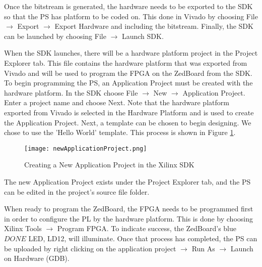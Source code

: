 Once the bitstream is generated, the hardware needs to be exported to the SDK so that the PS has platform to be coded on. This done in Vivado by choosing File $\rightarrow$ Export $\rightarrow$ Export Hardware and including the bitstream. Finally, the SDK can be launched by choosing File $\rightarrow$ Launch SDK.
\par
When the SDK launches, there will be a hardware platform project in the Project Explorer tab. This file contains the hardware platform that was exported from Vivado and will be used to program the FPGA on the ZedBoard from the SDK. To begin programming the PS, an Application Project must be created with the hardware platform. In the SDK choose File $\rightarrow$ New $\rightarrow$ Application Project. Enter a project name and choose Next. Note that the hardware platform exported from Vivado is selected in the Hardware Platform and is used to create the Application Project. Next, a template can be chosen to begin designing. We chose to use the 'Hello World' template. This process is shown in Figure \ref{newApplicationProject}.

\begin{figure}[H]
	\centerline{\texttt{[image: newApplicationProject.png]}}
	\caption{Creating a New Application Project in the Xilinx SDK}
	\label{newApplicationProject}
\end{figure}

The new Application Project exists under the Project Explorer tab, and the PS can be edited in the project's source file folder.
\par
When ready to program the ZedBoard, the FPGA needs to be programmed first in order to configure the PL by the hardware platform. This is done by choosing Xilinx Tools $\rightarrow$ Program FPGA. To indicate success, the ZedBoard's blue $DONE$ LED, LD12, will illuminate. Once that process has completed, the PS can be uploaded by right clicking on the application project $\rightarrow$ Run As $\rightarrow$ Launch on Hardware (GDB).



